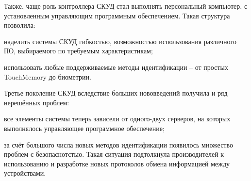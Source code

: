 Также, чаще роль контроллера СКУД стал выполнять персональный компьютер, с установленным управляющим программным обеспечением. Такая структура позволила:

\begin{itemize*}
\item наделить системы СКУД гибкостью, возможностью использования различного ПО, выбираемого по требуемым характеристикам;
\item использовать любые поддерживаемые методы идентификации -- от простых TouchMemory до биометрии.
\end{itemize*}


Третье поколение СКУД вследствие больших нововведений получила и ряд нерешённых проблем:

\begin{itemize*}
\item все элементы системы теперь зависели от одного-двух серверов, на которых выполнялось управляющее программное обеспечение;
\item за счёт большого числа новых методов идентификации появилось множество проблем с безопаснотстью. Такая ситуация подтолкнула производителей к использованию и разработке новых протоколов обмена информацией между устройствами.
\end{itemize*}
